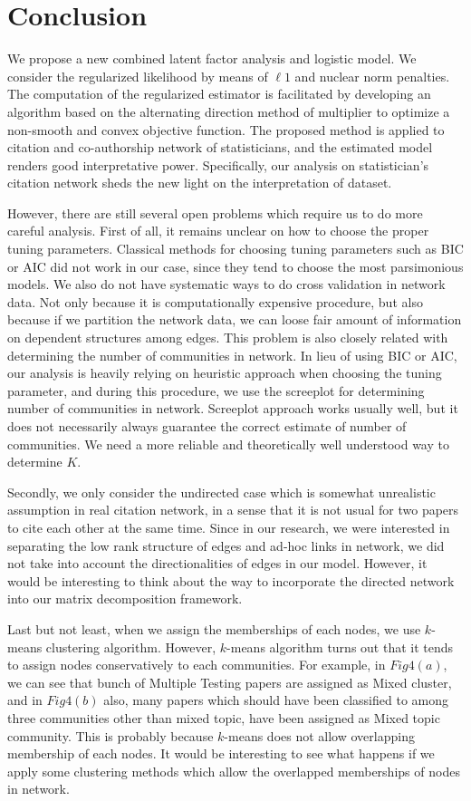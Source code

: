 \documentclass[AMS,STIX1COL]{WileyNJD-v2}
\begin{document}
\section{Conclusion}
We propose a new combined latent factor analysis and logistic model.
We consider the regularized likelihood by means of $\ell 1$ and nuclear norm penalties.
The computation of the regularized estimator is facilitated by developing an algorithm based on the alternating direction method of multiplier to optimize a non-smooth and convex objective function.
The proposed method is applied to citation and co-authorship network of statisticians, and the estimated model renders good interpretative power.
Specifically, our analysis on statistician's citation network sheds the new light on the interpretation of dataset.

However, there are still several open problems which require us to do more careful analysis.
First of all, it remains unclear on how to choose the proper tuning parameters.
Classical methods for choosing tuning parameters such as BIC or AIC did not work in our case, since they tend to choose the most parsimonious models.
We also do not have systematic ways to do cross validation in network data.
Not only because it is computationally expensive procedure, but also because if we partition the network data, we can loose fair amount of information on dependent structures among edges.
This problem is also closely related with determining the number of communities in network.
In lieu of using BIC or AIC, our analysis is heavily relying on heuristic approach when choosing the tuning parameter, and during this procedure, we use the screeplot for determining number of communities in network.
Screeplot approach works usually well, but it does not necessarily always guarantee the correct estimate of number of communities.
We need a more reliable and theoretically well understood way to determine $K$.

Secondly, we only consider the undirected case which is somewhat unrealistic assumption in real citation network, in a sense that it is not usual for two papers to cite each other at the same time.
Since in our research, we were interested in separating the low rank structure of edges and ad-hoc links in network, we did not take into account the directionalities of edges in our model.
However, it would be interesting to think about the way to incorporate the directed network into our matrix decomposition framework.

Last but not least, when we assign the memberships of each nodes, we use $k$-means clustering algorithm.
However, $k$-means algorithm turns out that it tends to assign nodes conservatively to each communities.
For example, in $Fig 4 (a)$, we can see that bunch of Multiple Testing papers are assigned as Mixed cluster, and in $Fig 4 (b)$ also, many papers which should have been classified to among three communities other than mixed topic, have been assigned as Mixed topic community.
This is probably because $k$-means does not allow overlapping membership of each nodes.
It would be interesting to see what happens if we apply some clustering methods which allow the overlapped memberships of nodes in network.
\end{document}
